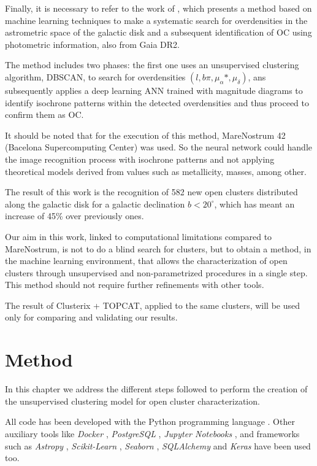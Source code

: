 \documentclass[11pt, a4paper, english]{book}
\begin{document}
Finally, it is necessary to refer to the work of \cite{castro2020hunting}, which presents a method based on machine learning techniques to make
a systematic search for overdensities in the astrometric space of the galactic disk and a subsequent identification of OC using photometric
information, also from Gaia DR2.

The method includes two phases: the first one uses an unsupervised clustering algorithm, DBSCAN, to search for overdensities
$(l, b \pi, \mu_{\alpha} *, \mu_{\delta})$, ans subsequently applies a deep learning ANN trained with magnitude diagrams to identify isochrone
patterns within the detected overdensities and thus proceed to confirm them as OC.

It should be noted that for the execution of this method, MareNostrum 42 (Bacelona Supercomputing Center) was used. So the neural network could handle
the image recognition process with isochrone patterns and not applying theoretical models derived from values such as metallicity, masses, among other.

The result of this work is the recognition of 582 new open clusters distributed along the galactic disk for a galactic declination $b < 20^{\circ}$,
which has meant an increase of 45\% over previously ones.

Our aim in this work, linked to computational limitations compared to MareNostrum, is not to do a blind search for clusters, but to obtain a method,
in the machine learning environment, that allows the characterization of open clusters through unsupervised and non-parametrized procedures in a
single step. This method should not require further refinements with other tools.

The result of Clusterix + TOPCAT, applied to the same clusters, will be used only for comparing and validating our results.

\chapter{Method}
\label{chap:method}

In this chapter we address the different steps followed to perform the creation of the unsupervised clustering model for open cluster characterization.

All code has been developed with the Python programming language \cite{Python3}. Other auxiliary tools like \emph{Docker} \cite{merkel2014docker},
\emph{PostgreSQL} \cite{postgresql}, \emph{Jupyter Notebooks} \cite{Kluyver2016jupyter}, and frameworks such as \emph{Astropy} \cite{astropy:2013} \cite{astropy:2018},
\emph{Scikit-Learn} \cite{scikit-learn}, \emph{Seaborn} \cite{michael_waskom_2017_883859}, \emph{SQLAlchemy} \cite{sqlalchemy} and
\emph{Keras} \cite{chollet2015keras} have been used too.
\end{document}
